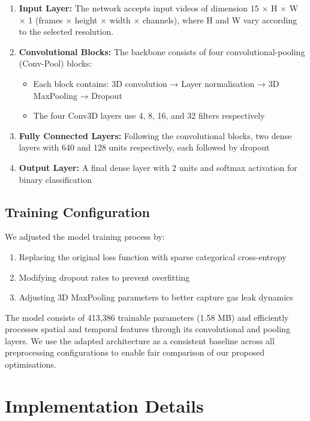 \begin{enumerate}
\item \textbf{Input Layer:} The network accepts input videos of dimension 15 × H × W × 1 (frames × height × width × channels), where H and W vary according to the selected resolution.

\item \textbf{Convolutional Blocks:} The backbone consists of four convolutional-pooling (Conv-Pool) blocks:
    \begin{itemize}
    \item Each block contains: 3D convolution → Layer normalisation → 3D MaxPooling → Dropout
    \item The four Conv3D layers use 4, 8, 16, and 32 filters respectively
    \end{itemize}

\item \textbf{Fully Connected Layers:} Following the convolutional blocks, two dense layers with 640 and 128 units respectively, each followed by dropout

\item \textbf{Output Layer:} A final dense layer with 2 units and softmax activation for binary classification
\end{enumerate}

\subsection{Training Configuration}

We adjusted the model training process by:
\begin{enumerate}
\item Replacing the original loss function with sparse categorical cross-entropy
\item Modifying dropout rates to prevent overfitting
\item Adjusting 3D MaxPooling parameters to better capture gas leak dynamics
\end{enumerate}

The model consists of 413,386 trainable parameters (1.58 MB) and efficiently processes spatial and temporal features through its convolutional and pooling layers. We use the adapted architecture as a consistent baseline across all preprocessing configurations to enable fair comparison of our proposed optimisations.

\section{Implementation Details}

